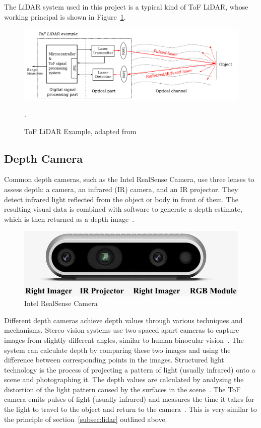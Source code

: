 The LiDAR system used in this project is a typical kind of ToF LiDAR, whose working principal is shown in Figure~\ref{fig:lidar_example}.

\begin{figure}[H]
    \centering
    \includegraphics[width=1\linewidth]{figs/lidar_example.png}
    \caption{ToF LiDAR Example, adapted from~\cite{lidarexample}}.
    \label{fig:lidar_example}
\end{figure}

\subsection{Depth Camera}
Common depth cameras, such as the Intel RealSense Camera, use three lenses to assess depth: 
a camera, an infrared (IR) camera, and an IR projector. 
They detect infrared light reflected from the object or body in front of them. 
The resulting visual data is combined with software to generate a depth estimate, 
which is then returned as a depth image~\cite{depthcam}.

\begin{figure}[H]
    \centering
    \includegraphics[width=1.0\linewidth]{figs/realsense.jpg}
    \caption{Intel RealSense Camera}
\end{figure}

Different depth cameras achieve depth values through various techniques and mechanisms. 
Stereo vision systems use two spaced apart cameras to capture images from slightly different angles, 
similar to human binocular vision~\cite{kinect}. 
The system can calculate depth by comparing these two images and using the difference between corresponding points in the images. 
Structured light technology is the process of projecting a pattern of light (usually infrared) onto a scene and photographing it. 
The depth values are calculated by analysing the distortion of the light pattern caused by the surfaces in the scene~\cite{rgbdmapping}.
The ToF camera emits pulses of light (usually infrared) and measures the time it takes for the light to travel to the object and return to the camera~\cite{tof}. 
This is very similar to the principle of section~\ref{subsec:lidar} outlined above.

